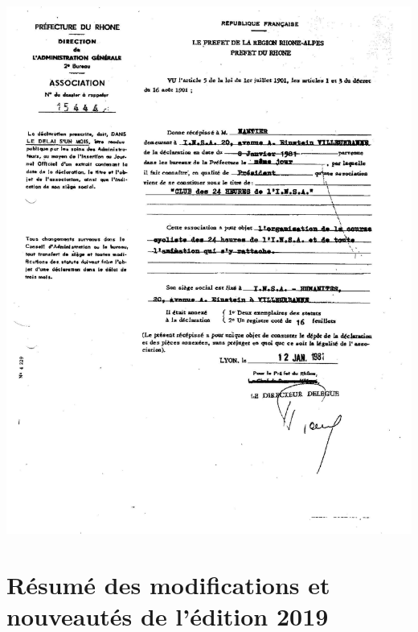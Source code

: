 \documentclass[hidelinks, paper=a4, fontsize=13pt]{report}
\begin{document}
\begin{center}
\includegraphics[scale=0.7]{Annexes/Images/decla}
\end{center}

\newpage

\section{Résumé des modifications et nouveautés de l'édition 2019}
\end{document}

